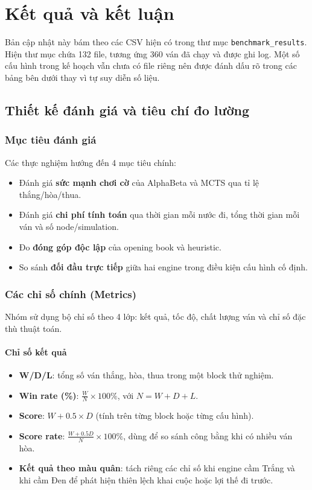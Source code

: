\section{Kết quả và kết luận}

\noindent
Bản cập nhật này bám theo các CSV hiện có trong thư mục \texttt{benchmark\_results}. Hiện thư mục chứa 132 file, tương ứng 360 ván đã chạy và được ghi log. Một số cấu hình trong kế hoạch vẫn chưa có file riêng nên được đánh dấu rõ trong các bảng bên dưới thay vì tự suy diễn số liệu.

\subsection{Thiết kế đánh giá và tiêu chí đo lường}

\subsubsection{Mục tiêu đánh giá}

Các thực nghiệm hướng đến 4 mục tiêu chính:
\begin{itemize}
    \item Đánh giá \textbf{sức mạnh chơi cờ} của AlphaBeta và MCTS qua tỉ lệ thắng/hòa/thua.
    \item Đánh giá \textbf{chi phí tính toán} qua thời gian mỗi nước đi, tổng thời gian mỗi ván và số node/simulation.
    \item Đo \textbf{đóng góp độc lập} của opening book và heuristic.
    \item So sánh \textbf{đối đầu trực tiếp} giữa hai engine trong điều kiện cấu hình cố định.
\end{itemize}

\subsubsection{Các chỉ số chính (Metrics)}

Nhóm sử dụng bộ chỉ số theo 4 lớp: kết quả, tốc độ, chất lượng ván và chỉ số đặc thù thuật toán.

\paragraph*{Chỉ số kết quả}
\begin{itemize}
    \item \textbf{W/D/L}: tổng số ván thắng, hòa, thua trong một block thử nghiệm.
    \item \textbf{Win rate (\%)}: \(\frac{W}{N}\times 100\%\), với \(N=W+D+L\).
    \item \textbf{Score}: \(W + 0.5\times D\) (tính trên từng block hoặc từng cấu hình).
    \item \textbf{Score rate}: \(\frac{W + 0.5D}{N}\times 100\%\), dùng để so sánh công bằng khi có nhiều ván hòa.
    \item \textbf{Kết quả theo màu quân}: tách riêng các chỉ số khi engine cầm Trắng và khi cầm Đen để phát hiện thiên lệch khai cuộc hoặc lợi thế đi trước.
\end{itemize}

